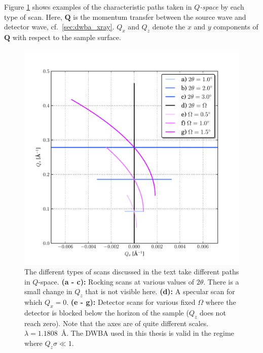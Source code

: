 \documentclass[10pt,twoside, b5paper,pdftex]{report}
\begin{document}
Figure \cref{fig:Q} shows examples of the characteristic paths taken in {\it $Q$-space} by each type of scan. Here, $\mathbf{Q}$ is the momentum transfer between the source wave and detector wave, cf.~\cref{sec:dwba_xray}. $Q_x$ and $Q_z$ denote the $x$ and $y$ components of $\mathbf{Q}$ with respect to the sample surface. 

\begin{figure}[htbp]
	\begin{center}
		\includegraphics[width=1.0\textwidth]{figures/Q.pdf}		
	\end{center}
	\caption{The different types of scans discussed in the text take different paths in $Q$-space. {\bf (a - c):} Rocking scans at various values of $2\theta$. There is a small change in $Q_z$ that is not visible here. {\bf (d):} A specular scan for which $Q_x = 0$. {\bf (e - g):} Detector scans for various fixed $\Omega$ where the detector is blocked below the horizon of the sample ($Q_z$ does not reach zero). Note that the axes are of quite different scales. $\lambda = 1.1808$~\si{\angstrom}. The DWBA used in this thesis is valid in the regime where $Q_z\sigma \ll 1$. \label{fig:Q}}
\end{figure}
\end{document}
